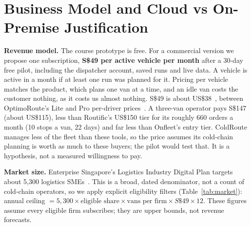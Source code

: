 \documentclass[10.5pt,a4paper]{article}
\newcommand{\Sd}{S\$}
\begin{document}
\section{Business Model and Cloud vs On-Premise Justification}
\textbf{Revenue model.} The course prototype is free. For a commercial version we propose one subscription,
\textbf{\Sd49 per active vehicle per month} after a 30-day free pilot, including the dispatcher account, saved runs and live
data. A vehicle is active in a month if at least one run was planned for it. Pricing per vehicle matches the product, which
plans one van at a time, and an idle van costs the customer nothing, as it costs us almost nothing. \Sd49 is about US\$38~\cite{fx},
between OptimoRoute's Lite and Pro per-driver prices~\cite{vendors}. A three-van operator pays \Sd147 (about US\$115), less than Routific's
US\$150 tier for its roughly 660 orders a month (10 stops a van, 22 days) and far less than Onfleet's entry tier. ColdRoute
manages less of the fleet than these tools, so the price assumes its cold-chain planning is worth as much to these buyers;
the pilot would test that. It is a hypothesis, not a measured willingness to pay.

\textbf{Market size.} Enterprise Singapore's Logistics Industry Digital Plan targets about 5,300 logistics SMEs~\cite{esg}. This is a broad,
dated denominator, not a count of cold-chain operators, so we apply explicit eligibility filters
(Table~\ref{tab:market}): annual ceiling $=5{,}300\times\text{eligible share}\times\text{vans per firm}\times\Sd49\times12$.
These figures assume every eligible firm subscribes; they are upper bounds, not revenue forecasts.
\end{document}
